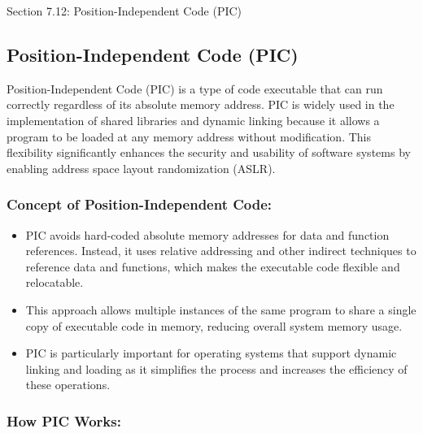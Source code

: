\begin{notes}{Section 7.12: Position-Independent Code (PIC)}
    \subsection*{Position-Independent Code (PIC)}

    Position-Independent Code (PIC) is a type of code executable that can run correctly regardless of its absolute memory address. PIC is widely used in the implementation of shared libraries and 
    dynamic linking because it allows a program to be loaded at any memory address without modification. This flexibility significantly enhances the security and usability of software systems by 
    enabling address space layout randomization (ASLR). \vspace*{1em}
    
    \subsubsection*{Concept of Position-Independent Code:}
    
    \begin{itemize}
        \item PIC avoids hard-coded absolute memory addresses for data and function references. Instead, it uses relative addressing and other indirect techniques to reference data and functions, 
        which makes the executable code flexible and relocatable.
        \item This approach allows multiple instances of the same program to share a single copy of executable code in memory, reducing overall system memory usage.
        \item PIC is particularly important for operating systems that support dynamic linking and loading as it simplifies the process and increases the efficiency of these operations.
    \end{itemize}
    
    \subsubsection*{How PIC Works:}
    

\end{notes}
